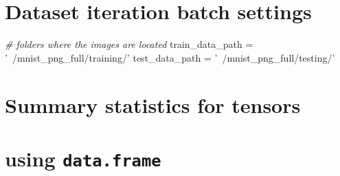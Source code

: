 \documentclass[]{book}
\newenvironment{Shaded}{\begin{snugshade}}{\end{snugshade}}
\newcommand{\CommentTok}[1]{\textcolor[rgb]{0.56,0.35,0.01}{\textit{#1}}}
\newcommand{\DataTypeTok}[1]{\textcolor[rgb]{0.13,0.29,0.53}{#1}}
\newcommand{\KeywordTok}[1]{\textcolor[rgb]{0.13,0.29,0.53}{\textbf{#1}}}
\newcommand{\NormalTok}[1]{#1}
\newcommand{\OperatorTok}[1]{\textcolor[rgb]{0.81,0.36,0.00}{\textbf{#1}}}
\newcommand{\StringTok}[1]{\textcolor[rgb]{0.31,0.60,0.02}{#1}}
\begin{document}
\hypertarget{dataset-iteration-batch-settings}{%
\section{Dataset iteration batch settings}\label{dataset-iteration-batch-settings}}

\begin{Shaded}
\begin{Highlighting}[]
\CommentTok{# folders where the images are located}
\NormalTok{train_data_path =}\StringTok{ '~/mnist_png_full/training/'}
\NormalTok{test_data_path  =}\StringTok{ '~/mnist_png_full/testing/'}
\end{Highlighting}
\end{Shaded}

\begin{Shaded}
\end{Shaded}

\hypertarget{summary-statistics-for-tensors}{%
\section{Summary statistics for tensors}\label{summary-statistics-for-tensors}}

\hypertarget{using-data.frame}{%
\section{\texorpdfstring{using \texttt{data.frame}}{using data.frame}}\label{using-data.frame}}
\end{document}
